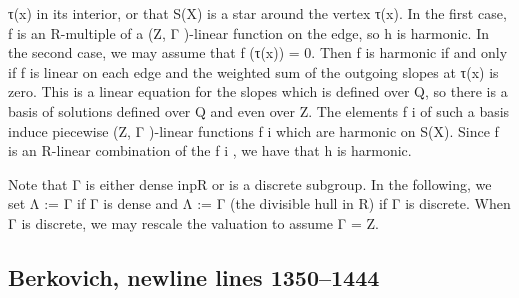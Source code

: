 \documentclass[
  10pt,
]{article}
\newenvironment{Shaded}{}{}
\newcommand{\NormalTok}[1]{#1}
\begin{document}
\begin{Shaded}
\begin{Highlighting}[]
\NormalTok{τ(x) in its interior, or that S(X) is a star around the vertex τ(x). In the first case, f is}
\NormalTok{an R{-}multiple of a (Z, Γ ){-}linear function on the edge, so h is harmonic. In the second}
\NormalTok{case, we may assume that f (τ(x)) = 0. Then f is harmonic if and only if f is linear on}
\NormalTok{each edge and the weighted sum of the outgoing slopes at τ(x) is zero. This is a linear}
\NormalTok{equation for the slopes which is defined over Q, so there is a basis of solutions defined}
\NormalTok{over Q and even over Z. The elements f i of such a basis induce piecewise (Z, Γ ){-}linear}
\NormalTok{functions f i which are harmonic on S(X). Since f is an R{-}linear combination of the f i ,}
\NormalTok{we have that h is harmonic.                                                                }

\NormalTok{   Note that Γ is either dense inpR or is a discrete subgroup. In the following, we set}
\NormalTok{Λ := Γ if Γ is dense and Λ := Γ (the divisible hull in R) if Γ is discrete. When Γ is}
\NormalTok{discrete, we may rescale the valuation to assume Γ = Z.}
\end{Highlighting}
\end{Shaded}

\subsection{Berkovich, newline lines
1350--1444}\label{berkovich-newline-lines-13501444}
\end{document}
